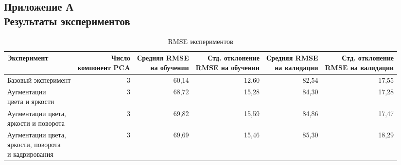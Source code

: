 \documentclass[a4paper,14pt]{article}
\begin{document}
    \begin{landscape}

        \begin{flushright}
            \section*{\normalsize \hfill Приложение А \\ \hfill Результаты экспериментов}
        \end{flushright}

        \begin{table}[H]
            \centering
            \caption{RMSE экспериментов}
            \label{tab:experiments_kpoints_rmse}
            \begin{tabular}{lrrrrr}
                \toprule
                Эксперимент & \makecell{Число \\ компонент PCA } & \makecell{Средняя RMSE \\ на обучении} & \makecell{Стд. отклонение \\ RMSE на обучении} & \makecell{Средняя RMSE \\ на валидации} & \makecell{Стд. отклонение \\ RMSE на валидации} \\
                \midrule
                Базовый эксперимент & 3 & 60,14 & 12,60 & 82,54 & 17,55 \\ \hline
                \makecell{Аугментации \\ цвета и яркости} & 3 & 68,72 & 15,28 & 84,30 & 17,28 \\ \hline
                \makecell{Аугментации цвета,\\ яркости и поворота} & 3 & 69,82 & 15,59 & 84,86 & 17,47 \\ \hline
                \makecell{Аугментации цвета,\\ яркости, поворота \\ и кадрирования} & 3 & 69,69 & 15,46 & 85,30 & 18,29 \\
                \bottomrule
            \end{tabular}
        \end{table}


\end{landscape}
\end{document}
